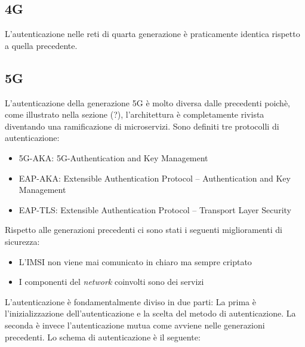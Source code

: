 \clearpage

\subsection{4G}
L'autenticazione nelle reti di quarta generazione è praticamente identica rispetto a quella precedente.

\clearpage

\subsection{5G}
L'autenticazione della generazione 5G è molto diversa dalle precedenti poichè, come illustrato nella sezione (?), l'architettura è completamente rivista diventando una ramificazione di microservizi.
Sono definiti tre protocolli di autenticazione:
\begin{itemize}
    \item 5G-AKA: 5G-Authentication and Key Management
    \item EAP-AKA: Extensible Authentication Protocol – Authentication and Key Management
    \item EAP-TLS: Extensible Authentication Protocol – Transport Layer Security
\end{itemize}
Rispetto alle generazioni precedenti ci sono stati i seguenti miglioramenti di sicurezza\cite{5g-vs-4g}:
\begin{itemize}
    \item L'IMSI non viene mai comunicato in chiaro ma sempre criptato
    \item I componenti del \textit{network} coinvolti sono dei servizi
\end{itemize}
L'autenticazione è fondamentalmente diviso in due parti: La prima è l'inizializzazione dell'autenticazione e la scelta del metodo di autenticazione.
La seconda è invece l'autenticazione mutua come avviene nelle generazioni precedenti.
Lo schema di autenticazione è il seguente\cite{5g-auth}:
